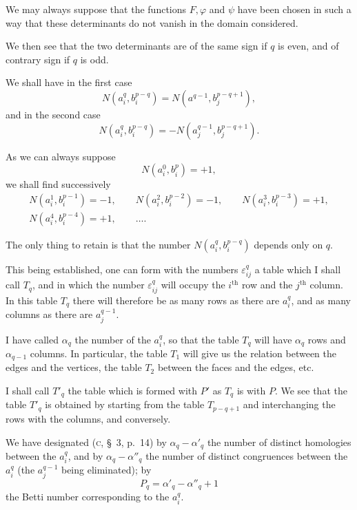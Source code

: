 \documentclass{article}
\begin{document}
We may always suppose that the functions $F, \varphi$ and $\psi$ have been chosen in such a way that these determinants do not vanish in the domain considered.

We then see that the two determinants are of the same sign if $q$ is even, and of contrary sign if $q$ is odd.

We shall have in the first case
\[ N(a^{q}_{i}, b^{p-q}_{i}) = N(a^{q-1}, b^{p-q+1}_{j}), \]
and in the second case
\[ N(a^{q}_{i}, b^{p-q}_{i}) = -N(a^{q-1}_{j}, b^{p-q+1}_{j}). \]

As we can always suppose
\[ N(a^{0}_{i}, b^{p}_{i}) = +1, \]
we shall find successively
\[ \begin{gathered} N(a^{1}_{i}, b^{p-1}_{i}) = -1, \qquad N(a^{2}_{i}, b^{p-2}_{i}) = -1, \qquad N(a^{3}_{i}, b^{p-3}_{i}) = +1, \\ N(a^{4}_{i}, b^{p-4}_{i}) = +1, \qquad \ldots. \end{gathered} \]

The only thing to retain is that the number $N(a^{q}_{i}, b^{p-q}_{i})$ depends only on $q$.

This being established, one can form with the numbers $\varepsilon^{q}_{ij}$ a table which I shall call $T_{q}$, and in which the number $\varepsilon^{q}_{ij}$ will occupy the $i^{\text{th}}$ row and the $j^{\text{th}}$ column. In this table $T_{q}$ there will therefore be as many rows as there are $a^{q}_{i}$, and as many columns as there are $a^{q-1}_{j}$.

I have called $\alpha_{q}$ the number of the $a^{q}_{i}$, so that the table $T_{q}$ will have $\alpha_{q}$ rows and $\alpha_{q-1}$ columns. In particular, the table $T_{1}$ will give us the relation between the edges and the vertices, the table $T_{2}$ between the faces and the edges, etc.

I shall call $T'_{q}$ the table which is formed with $P'$ as $T_{q}$ is with $P$. We see that the table $T'_{q}$ is obtained by starting from the table $T_{p-q+1}$ and interchanging the rows with the columns, and conversely.

We have designated (\textsc{c}, \S~3, p.\ 14) by $\alpha_{q} - \alpha'_{q}$ the number of distinct homologies between the $a^{q}_{i}$, and by $\alpha_{q} - \alpha''_{q}$ the number of distinct congruences between the $a^{q}_{i}$ (the $a^{q-1}_{j}$ being eliminated); by
\[ P_{q} = \alpha'_{q} - \alpha''_{q} + 1 \]
the Betti number corresponding to the $a^{q}_{i}$.
\end{document}
